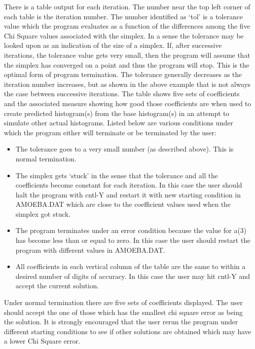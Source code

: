       There is a table output for each iteration.  The number near the
   top left corner of each table is the iteration number.  The number
   identified as `tol' is a tolerance value which the program evaluates as
   a function of the differences among the five Chi Square values
   associated with the simplex.  In a sense the tolerance may be looked
   upon as an indication of the size of a simplex.  If, after successive
   iterations, the tolerance value gets very small, then the program will
   assume that the simplex has converged on a point and thus the program
   will stop.  This is the optimal form of program termination.  The
   tolerance generally decreases as the iteration number increases, but as
   shown in the above example that is not always the case between
   successive iterations.  The table shows five sets of coefficients and
   the associated measure showing how good those coefficients are when
   used to create predicted histogram(s) from the base histogram(s) in an
   attempt to simulate other actual histograms.
       Listed below are various conditions under which the program either
   will terminate or be terminated by the user:
\begin{itemize}   
         \item  The tolerance goes to a very small number (as described
                above).  This is normal termination.
         \item  The simplex gets `stuck' in the sense that the tolerance
                and all the coefficients become constant for each
                iteration.  In this case the user should halt the
                program with cntl-Y and restart it with new starting
                condition in AMOEBA.DAT which are close to the coefficient
                values used when the simplex got stuck.
         \item  The program terminates under an error condition because
                the value for a(3) has become less than or equal to
                zero.  In this case the user should restart the program
                with different values in AMOEBA.DAT.
         \item  All coefficients in each vertical column of the table
                are the same to within a desired number of digits of
                accuracy.  In this case the user may hit cntl-Y and
                accept the current solution.
\end{itemize}

       Under normal termination there are five sets of coefficients
   displayed.  The user should accept the one of those which has the
   smallest chi square error as being the solution.  It is strongly
   encouraged that the user rerun the program under different starting
   conditions to see if other solutions are obtained which may have a
   lower Chi Square error.

